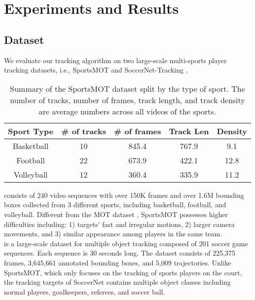 \documentclass[10pt,twocolumn,letterpaper]{article}
\begin{document}
\section{Experiments and Results}


\subsection{Dataset}
We evaluate our tracking algorithm on two large-scale multi-sports player tracking datasets, i.e., SportsMOT \cite{cui2023sportsmot} and SoccerNet-Tracking \cite{cioppa2022soccernet}.\\
\begin{table}[h]
\small
\begin{tabular}{ccccc}
\hline
Sport Type & \# of tracks & \# of frames & Track Len & Density \\ \hline
Basketball & 10 & 845.4 & 767.9 & 9.1  \\
Football   & 22 & 673.9 & 422.1 & 12.8 \\
Volleyball & 12 & 360.4 & 335.9 & 11.2 \\ \hline
\end{tabular}
\caption{Summary of the SportsMOT dataset split by the type of sport. The number of tracks, number of frames, track length, and track density are average numbers across all videos of the sports. }
\end{table}

 consists of 240 video sequences with over 150K frames and over 1.6M bounding boxes collected from 3 different sports, including basketball, football, and volleyball. Different from the MOT dataset \cite{mot16,dendorfer2020mot20}, SportsMOT possesses higher difficulties including: 1) targets' fast and irregular motions, 2) larger camera movements, and 3) similar appearance among players in the same team.\\
 is a large-scale dataset for multiple object tracking composed of 201 soccer game sequences. Each sequence is 30 seconds long. The dataset consists of 225,375 frames, 3,645,661 annotated bounding boxes, and 5,009 trajectories. Unlike SportsMOT, which only focuses on the tracking of sports players on the court, the tracking targets of SoccerNet contains multiple object classes including normal players, goalkeepers, referees, and soccer ball.
\end{document}
